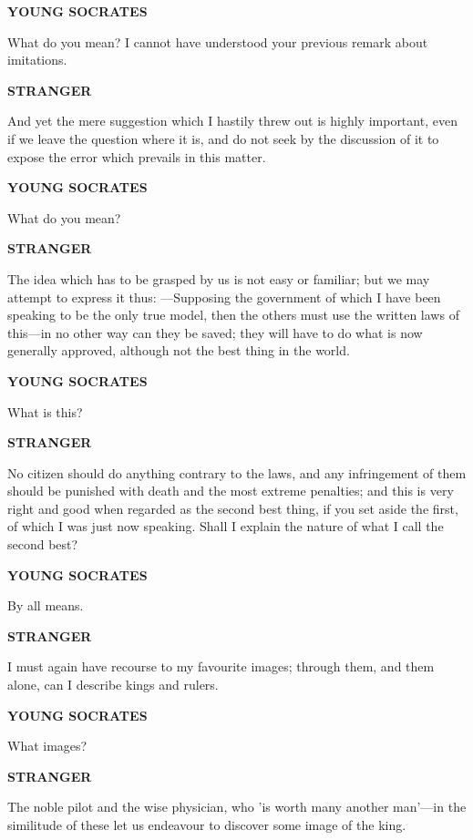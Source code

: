\documentclass[11pt,letter]{article}
\begin{document}
\par \textbf{YOUNG SOCRATES}
\par   What do you mean? I cannot have understood your previous remark about imitations.

\par \textbf{STRANGER}
\par   And yet the mere suggestion which I hastily threw out is highly important, even if we leave the question where it is, and do not seek by the discussion of it to expose the error which prevails in this matter.

\par \textbf{YOUNG SOCRATES}
\par   What do you mean?

\par \textbf{STRANGER}
\par   The idea which has to be grasped by us is not easy or familiar; but we may attempt to express it thus: —Supposing the government of which I have been speaking to be the only true model, then the others must use the written laws of this—in no other way can they be saved; they will have to do what is now generally approved, although not the best thing in the world.

\par \textbf{YOUNG SOCRATES}
\par   What is this?

\par \textbf{STRANGER}
\par   No citizen should do anything contrary to the laws, and any infringement of them should be punished with death and the most extreme penalties; and this is very right and good when regarded as the second best thing, if you set aside the first, of which I was just now speaking. Shall I explain the nature of what I call the second best?

\par \textbf{YOUNG SOCRATES}
\par   By all means.

\par \textbf{STRANGER}
\par   I must again have recourse to my favourite images; through them, and them alone, can I describe kings and rulers.

\par \textbf{YOUNG SOCRATES}
\par   What images?

\par \textbf{STRANGER}
\par   The noble pilot and the wise physician, who 'is worth many another man'—in the similitude of these let us endeavour to discover some image of the king.
\end{document}
